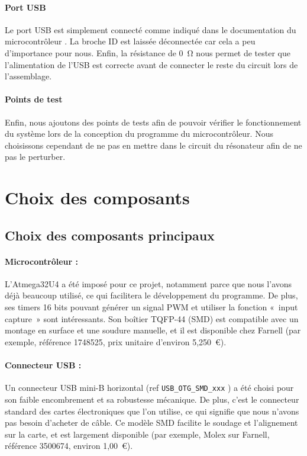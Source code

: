 \documentclass[12pt, a4paper, titlepage]{article}
\begin{document}
\paragraph{Port USB}

Le port USB est simplement connecté comme indiqué dans le documentation du microcontrôleur \cite{Documentation ATMEGA32U4}. La broche ID est laissée déconnectée car cela a peu d'importance pour nous. Enfin, la résistance de \SI{0}{\ohm} nous permet de tester que l'alimentation de l'USB est correcte avant de connecter le reste du circuit lors de l'assemblage.

\paragraph{Points de test}

Enfin, nous ajoutons des points de tests afin de pouvoir vérifier le fonctionnement du système lors de la conception du programme du microcontrôleur. Nous choisissons cependant de ne pas en mettre dans le circuit du résonateur afin de ne pas le perturber.

\section{Choix des composants}

\subsection{Choix des composants principaux}

\paragraph{Microcontrôleur :}

L’Atmega32U4 a été imposé pour ce projet, notamment parce que nous l'avons déjà beaucoup utilisé, ce qui facilitera le développement du programme. De plus, ses timers 16 bits pouvant générer un signal PWM et utiliser la fonction «~input capture~» sont intéressants. Son boîtier TQFP-44 (SMD) est compatible avec un montage en surface et une soudure manuelle, et il est disponible chez Farnell (par exemple, référence 1748525, prix unitaire d’environ 5,250~€).

\paragraph{Connecteur USB :}

Un connecteur USB mini-B horizontal (ref \texttt{USB\_OTG\_SMD\_xxx} ) a été choisi pour son faible encombrement et sa robustesse mécanique. De plus, c'est le connecteur standard des cartes électroniques que l'on utilise, ce qui signifie que nous n'avons pas besoin d'acheter de câble. Ce modèle SMD facilite le soudage et l’alignement sur la carte, et est largement disponible (par exemple, Molex sur Farnell, référence 3500674, environ 1,00~€).
\end{document}

